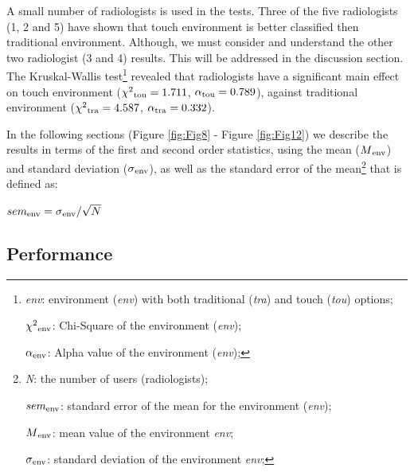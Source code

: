 \documentclass{sigchi}
\begin{document}
A small number of radiologists is used in the tests. Three of the five radiologists (1, 2 and 5) have shown that touch environment is better classified then traditional environment. Although, we must consider and understand the other two radiologist (3 and 4) results. This will be addressed in the discussion section. The Kruskal-Wallis test\footnote{
\textit{env}: environment (\textit{env}) with both traditional (\textit{tra}) and touch (\textit{tou}) options;

$\chi^2\textsubscript{env}$: Chi-Square of the environment (\textit{env});

$\alpha\textsubscript{env}$: Alpha value of the environment (\textit{env});
} revealed that radiologists have a significant main effect on touch environment ($\chi^2\textsubscript{tou} = 1.711$, $\alpha\textsubscript{tou} = 0.789$), against traditional environment ($\chi^2\textsubscript{tra} = 4.587$, $\alpha\textsubscript{tra} = 0.332$).


In the following sections (Figure \ref{fig:Fig8} - Figure \ref{fig:Fig12}) we describe the results in terms of the first and second order statistics, using the mean ($M\textsubscript{env}$) and standard deviation ($\sigma\textsubscript{env}$), as well as the standard error of the mean\footnote{
\textit{N}: the number of users (radiologists);

$sem\textsubscript{env}$: standard error of the mean for the environment (\textit{env});

$M\textsubscript{env}$: mean value of the environment \textit{env};

$\sigma\textsubscript{env}$: standard deviation of the environment \textit{env};
} that is defined as:

\begin{center}
$sem\textsubscript{env} = \sigma\textsubscript{env}/\sqrt{N}$
\end{center}


\subsection{Performance}
\end{document}
